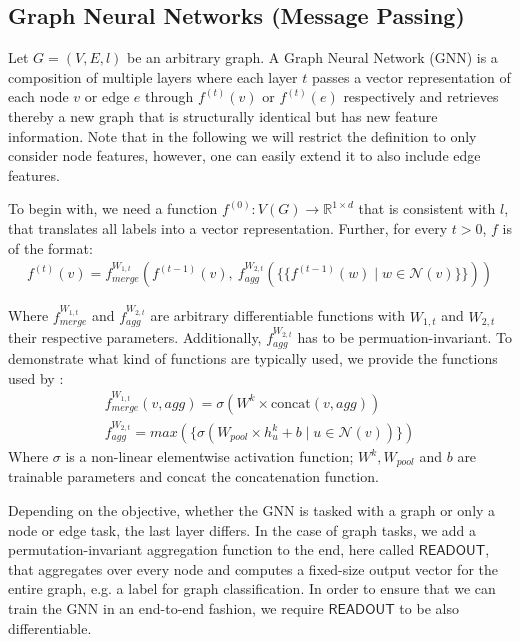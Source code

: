 \documentclass[11pt, dvipsnames, DIV=12]{scrreprt}
\theoremstyle{definition}
\newcommand{\MSopen}{\{\!\!\{}
\newcommand{\MSclose}{\}\!\!\}}
\begin{document}
\subsection{Graph Neural Networks (Message Passing)}\label{sec:GNN Defintion}
Let $G = (V, E, l)$ be an arbitrary graph. A Graph Neural Network (GNN) is a composition of multiple layers where each layer $t$ passes a vector representation of each node $v$ or edge $e$ through $f^{(t)}(v)$ or $f^{(t)}(e)$ respectively and retrieves thereby a new graph that is structurally identical but has new feature information. Note that in the following we will restrict the definition to only consider node features, however, one can easily extend it to also include edge features. 

To begin with, we need a function $f^{(0)}: V(G) \rightarrow \mathbb{R}^{1 \times d}$ that is consistent with $l$, that translates all labels into a vector representation. Further, for every $t > 0$, $f$ is of the format:
\begin{align}
f^{(t)}(v) = f^{W_{1,t}}_{merge} (f^{(t-1)}(v), \  f^{W_{2,t}}_{agg}( \MSopen f^{(t-1)}(w) \mid w \in \mathcal{N}(v) \MSclose ))
\end{align}

\noindent Where $f^{W_{1,t}}_{merge}$ and $f^{W_{2,t}}_{agg}$ are arbitrary differentiable functions with $W_{1,t}$ and $W_{2,t}$ their respective parameters. Additionally, $f^{W_{2,t}}_{agg}$ has to be permuation-invariant. To demonstrate what kind of functions are typically used, we provide the functions used by \cite{Ham+2017}:
\begin{align}
    f^{W_{1,t}}_{merge}(v, agg) = \sigma (W^k \times \text{concat}(v, agg))\\
    f^{W_{2,t}}_{agg} = max(\{ \sigma(W_{pool} \times h_u^k + b \mid u \in \mathcal{N}(v))\})
\end{align}
\noindent Where $\sigma$ is a non-linear elementwise activation function; $W^k, W_{pool}$ and $b$ are trainable parameters and concat the concatenation function.

Depending on the objective, whether the GNN is tasked with a graph or only a node or edge task, the last layer differs. In the case of graph tasks, we add a permutation-invariant aggregation function to the end, here called $\textsf{READOUT}$, that aggregates over every node and computes a fixed-size output vector for the entire graph, e.g. a label for graph classification. In order to ensure that we can train the GNN in an end-to-end fashion, we require $\textsf{READOUT}$ to be also differentiable.
\end{document}
